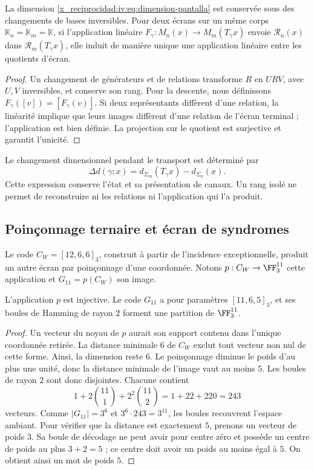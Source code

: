 \begin{proposition}
\label{x_reciprocidad:iv:prop:pantalla-transporte}
La dimension \eqref{x_reciprocidad:iv:eq:dimension-pantalla} est conservée
sous des changements de bases inversibles. Pour deux écrans sur un même corps
\(\mathbb K_n=\mathbb K_m=\mathbb K\), si l’application linéaire
\(F_\gamma:M_n(x)\to M_m(T_\gamma x)\) envoie
\(\mathcal R_n(x)\) dans \(\mathcal R_m(T_\gamma x)\), elle induit
de manière unique une application linéaire entre les quotients d’écran.
\end{proposition}
\begin{proof}
Un changement de générateurs et de relations transforme \(R\) en
\(URV\), avec \(U,V\) inversibles, et conserve son rang. Pour
la descente, nous définissons
\(\overline F_\gamma([v])=[F_\gamma(v)]\). Si deux
représentants diffèrent d’une relation, la linéarité implique que leurs images diffèrent
d’une relation de l’écran terminal ; l’application est
bien définie. La projection sur le quotient est surjective et
garantit l’unicité.
\end{proof}

Le changement dimensionnel pendant le transport est déterminé
par
\[
 \Delta d(\gamma;x)=d_{\Sigma_m}(T_\gamma x)
                         -d_{\Sigma_n}(x).
\]
Cette expression conserve l’état et sa présentation de canaux.
Un rang isolé ne permet de reconstruire ni les relations ni
l’application qui l’a produit.

\subsection{Poinçonnage ternaire et écran de syndromes}

Le code \(C_W=[12,6,6]_3\), construit à partir de
l’incidence exceptionnelle, produit un autre écran par
poinçonnage d’une coordonnée. Notons
\(p:C_W\to\FF_3^{11}\) cette application et
\(G_{11}=p(C_W)\) son image.

\begin{proposition}
\label{x_reciprocidad:iv:prop:codigo-once}
L’application \(p\) est injective. Le code \(G_{11}\) a pour
paramètres \([11,6,5]_3\), et ses boules de Hamming de rayon
\(2\) forment une partition de \(\FF_3^{11}\).
\end{proposition}
\begin{proof}
Un vecteur du noyau de \(p\) aurait son support contenu dans
l’unique coordonnée retirée. La distance minimale \(6\)
de \(C_W\) exclut tout vecteur non nul de cette forme.
Ainsi, la dimension reste \(6\). Le poinçonnage diminue
le poids d’au plus une unité, donc la distance minimale
de l’image vaut au moins \(5\). Les boules de rayon \(2\)
sont donc disjointes. Chacune contient
\[
 1+2\binom{11}{1}+2^2\binom{11}{2}
 =1+22+220=243
\]
vecteurs. Comme \(|G_{11}|=3^6\) et
\(3^6\cdot243=3^{11}\), les boules recouvrent l’espace ambiant.
Pour vérifier que la distance est exactement \(5\),
prenons un vecteur de poids \(3\). Sa boule de décodage
ne peut avoir pour centre zéro et possède un centre de poids au
plus \(3+2=5\) ; ce centre doit avoir un poids au moins égal à
\(5\). On obtient ainsi un mot de poids \(5\).
\end{proof}


